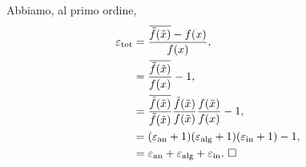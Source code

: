 \Proof Abbiamo, al primo ordine,
\begin{align*}
  \varepsilon_{\text{tot}}
  &= \frac{\overline{\tilde{f}(\tilde{x})} - f(x)}{f(x)},\\
  &= \frac{\overline{\tilde{f}(\tilde{x})}}{f(x)} - 1,\\
  &= \frac{\overline{\tilde{f}(\tilde{x})}}{\tilde{f}(\tilde{x})}
      \frac{\tilde{f}(\tilde{x})}{f(\tilde{x})}
      \frac{f(\tilde{x})}{f(x)} - 1,\\
  &= (\varepsilon_{\text{an}} + 1)
      (\varepsilon_{\text{alg}} + 1)
      (\varepsilon_{\text{in}} + 1) - 1,\\
  &= \varepsilon_{\text{an}} + \varepsilon_{\text{alg}} + \varepsilon_{\text{in}}.\text{ $\square$}
\end{align*}
